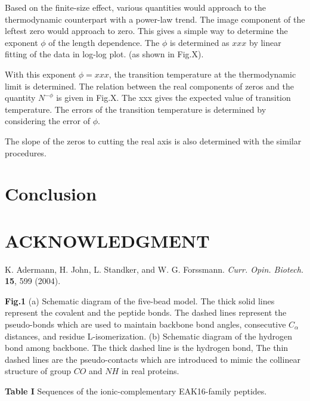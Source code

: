 \documentclass[aps,pre,twocolumn,showpacs,preprintnumbers,amsmath,amssymb]{revtex4-1}
\begin{document}
Based on the finite-size effect, various quantities would approach to the
thermodynamic counterpart with a power-law trend. The image component of
the leftest zero would approach to zero. This gives a simple way to
determine the exponent $\phi$ of the length dependence. The $\phi$ is
determined as $xxx$ by linear fitting of the data in log-log plot. (as
shown in Fig.X).

With this exponent $\phi=xxx$, the transition temperature at the
thermodynamic limit is determined. The relation between the real
components of zeros and the quantity $N^{-\phi}$ is given in Fig.X.
The xxx gives the expected value of transition temperature. The
errors of the transition temperature is determined by considering
the error of $\phi$.

The slope of the zeros to cutting the real axis is also determined
with the similar procedures.

\section{Conclusion}

\section*{ACKNOWLEDGMENT}

\begin{thebibliography}{10}

K. Adermann, H. John, L. Standker, and W. G. Forssmann.
{\it Curr. Opin. Biotech.} {\bf 15}, 599 (2004).

\end{thebibliography}

\newpage
\vspace{0.5cm}
\parindent 0pt {\large {\bf Fig.1}}
(a) Schematic diagram of the five-bead model. The thick solid lines
represent the covalent and the peptide bonds. The dashed lines
represent the pseudo-bonds which are used to maintain backbone bond
angles, consecutive $C_{\alpha}$ distances, and residue
L-isomerization. (b) Schematic diagram of the hydrogen bond among
backbone. The thick dashed line is the hydrogen bond, The thin
dashed lines are the pseudo-contacts which are introduced to mimic
the collinear structure of group $CO$ and $NH$ in real proteins.

\vspace{0.5cm}
\parindent 0pt {\large {\bf Table I}}
Sequences of the ionic-complementary EAK16-family peptides.
\end{document}
